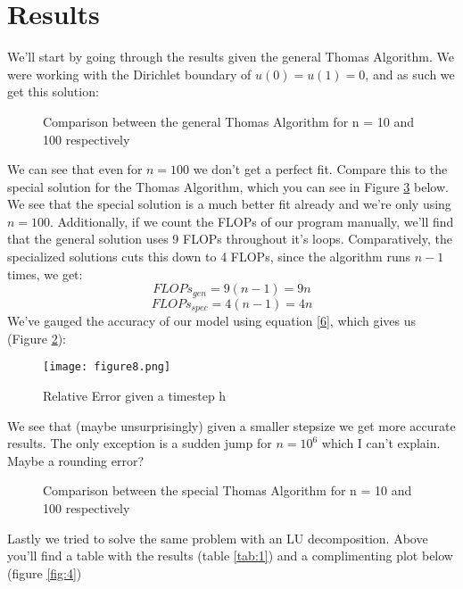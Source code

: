 \documentclass{article}
\begin{document}
\section{Results}
We'll start by going through the results given the general Thomas Algorithm. We were working with the Dirichlet boundary of $u(0) = u(1) = 0$, and as such we get this solution:
\begin{figure}[hbt!] %
    \qquad
    \caption{Comparison between the general Thomas Algorithm for n = 10 and 100 respectively}%
    \label{fig:1}%
\end{figure}
\break
We can see that even for $n = 100$ we don't get a perfect fit.
Compare this to the special solution for the Thomas Algorithm, which you can see in Figure \ref{fig:2} below.
We see that the special solution is a much better fit already and we're only using $n = 100$.
Additionally, if we count the FLOPs of our program manually, we'll find that the general solution uses 9 FLOPs throughout it's loops. Comparatively, the specialized solutions cuts this down to 4 FLOPs, since the algorithm runs $n-1$ times, we get:
\begin{equation*}
FLOPs_{gen} = 9(n-1) = 9n
\end{equation*}
\begin{equation*}
FLOPs_{spec} = 4(n-1) = 4n
\end{equation*}
We've gauged the accuracy of our model using equation \ref{6}, which gives us (Figure \ref{fig:3}):
\break
\begin{figure}
    \centering
    \texttt{[image: figure8.png]}
    \caption{Relative Error given a timestep h}
    \label{fig:3}
\end{figure}
We see that (maybe unsurprisingly) given a smaller stepsize we get more accurate results. The only exception is a sudden jump for $n=10^6$ which I can't explain. Maybe a rounding error?
\begin{figure}[hbt!]
    \qquad
    \caption{Comparison between the special Thomas Algorithm for n = 10 and 100 respectively}%
    \label{fig:2}%
\end{figure}
\break
Lastly we tried to solve the same problem with an LU decomposition. Above you'll find a table with the results (table \ref{tab:1}) and a complimenting plot below (figure \ref{fig:4})
\end{document}
